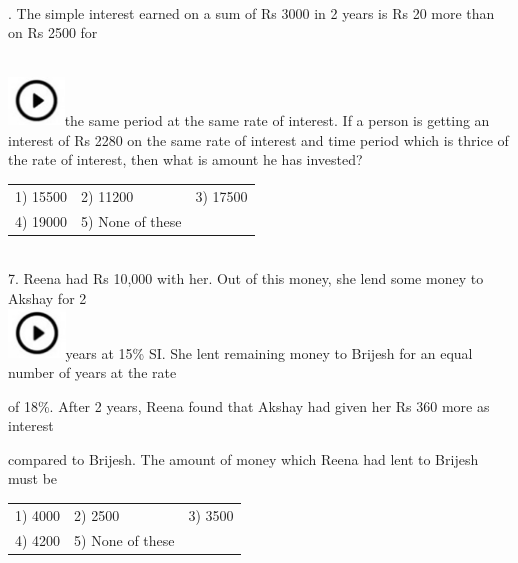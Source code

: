 \documentclass{article}
\begin{document}
	\noindent 
	
	\noindent  \\  
	
	.   The simple interest earned on a sum of Rs 3000 in 2 years is Rs 20 more than on Rs 2500 for
	
	\noindent 
	
	\noindent \noindent \\ \includegraphics*[width=0.59in, height=0.52in]{images/image1}the same period at the same rate of interest. If a person is getting an interest of Rs 2280 on the same rate of interest and time period which is thrice of the rate of interest, then what is amount he has invested?
	
	\noindent \begin{tabular}{p{1.7in} p{1.6in} p{1.6in}} \\ 
 1) 15500                  & 2) 11200           & 3) 17500           \\
4) 19000           & 5) None of these  \\
\end{tabular}
	
	\noindent  \\  
	
	7.   Reena had Rs 10,000 with her. Out of this money, she lend some money to Akshay for 2 \noindent \\ \includegraphics*[width=0.60in, height=0.52in]{images/image1}years at 15\% SI. She lent remaining money to Brijesh for an equal number of years at the rate
	
	\noindent of 18\%. After 2 years, Reena found that Akshay had given her Rs 360 more as interest
	
	\noindent 
	
	\noindent compared to Brijesh. The amount of money which Reena had lent to Brijesh must be
	
	\noindent 
	
	\noindent \begin{tabular}{p{1.7in} p{1.6in} p{1.6in}} \\ 
 1) 4000                    & 2) 2500             & 3) 3500             \\
4) 4200             & 5) None of these  \\
\end{tabular}
	
\end{document}
